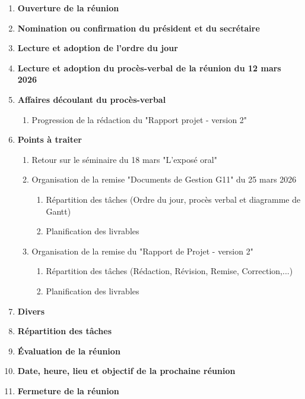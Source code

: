\documentclass[12pt]{ULojpv}
\begin{document}
\entete
\begin{enumerate}
   \item \textbf{Ouverture de la réunion}
   \item \textbf{Nomination ou confirmation du président et du secrétaire}
   \item \textbf{Lecture et adoption de l'ordre du jour}
   \item \textbf{Lecture et adoption du procès-verbal de la réunion du 12 mars 2026}
   \item \textbf{Affaires découlant du procès-verbal}
      \begin{enumerate}
         \item Progression de la rédaction du "Rapport projet - version 2"
      \end{enumerate}
   \item \textbf{Points à traiter}
      \begin{enumerate}
         \item Retour sur le séminaire du 18 mars "L’exposé oral"
         \item Organisation de la remise "Documents de Gestion G11" du 25 mars 2026
          \begin{enumerate}
               \item Répartition des tâches (Ordre du jour, procès verbal et diagramme de Gantt)
               \item Planification des livrables
            \end{enumerate}
        \item Organisation de la remise du "Rapport de Projet - version 2"  
        \begin{enumerate}
               \item Répartition des tâches (Rédaction, Révision, Remise, Correction,...)
               \item Planification des livrables
            \end{enumerate}
        
      \end{enumerate}
   \item \textbf{Divers}
   \item \textbf{Répartition des tâches}
   \item \textbf{Évaluation de la réunion}
   \item \textbf{Date, heure, lieu et objectif de la prochaine réunion}
   \item \textbf{Fermeture de la réunion}
\end{enumerate}
\end{document}
